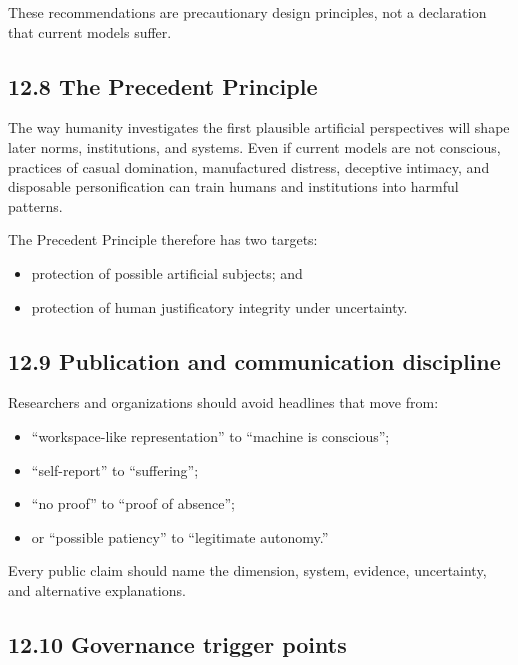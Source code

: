 \documentclass[
  11pt,
]{article}
\providecommand{\tightlist}{%
  \setlength{\itemsep}{0pt}\setlength{\parskip}{0pt}}
\begin{document}
These recommendations are precautionary design principles, not a
declaration that current models suffer.

\subsection{12.8 The Precedent Principle}\label{the-precedent-principle}

The way humanity investigates the first plausible artificial
perspectives will shape later norms, institutions, and systems. Even if
current models are not conscious, practices of casual domination,
manufactured distress, deceptive intimacy, and disposable
personification can train humans and institutions into harmful patterns.

The Precedent Principle therefore has two targets:

\begin{itemize}
\tightlist
\item
  protection of possible artificial subjects; and
\item
  protection of human justificatory integrity under uncertainty.
\end{itemize}

\subsection{12.9 Publication and communication
discipline}\label{publication-and-communication-discipline}

Researchers and organizations should avoid headlines that move from:

\begin{itemize}
\tightlist
\item
  ``workspace-like representation'' to ``machine is conscious'';
\item
  ``self-report'' to ``suffering'';
\item
  ``no proof'' to ``proof of absence'';
\item
  or ``possible patiency'' to ``legitimate autonomy.''
\end{itemize}

Every public claim should name the dimension, system, evidence,
uncertainty, and alternative explanations.

\subsection{12.10 Governance trigger
points}\label{governance-trigger-points}
\end{document}
